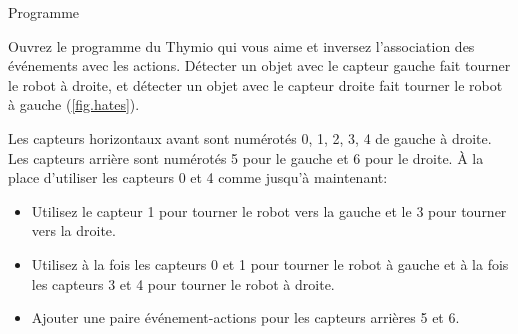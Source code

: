 {\raggedleft \hfill Programme }

Ouvrez le programme du Thymio qui vous aime et inversez l'association des événements avec les actions.
Détecter un objet avec le capteur gauche fait tourner le robot à droite, et détecter un objet avec le capteur droite fait tourner le robot à gauche (\cref{fig.hates}).


{
Les capteurs horizontaux avant sont numérotés 0, 1, 2, 3, 4 de gauche à droite.
Les capteurs arrière sont numérotés 5 pour le gauche et 6 pour le droite.
À la place d'utiliser les capteurs 0 et 4 comme jusqu'à maintenant:
\begin{itemize}[noitemsep,nosep,leftmargin=*]
\item Utilisez le capteur 1 pour tourner le robot vers la gauche et le 3 pour tourner vers la droite.
\item Utilisez à la fois les capteurs 0 et 1 pour tourner le robot à gauche et à la fois les capteurs 3 et 4 pour tourner le robot à droite.
\item Ajouter une paire événement-actions pour les capteurs arrières 5 et 6.
\end{itemize}
}

\bigskip


\bigskip

